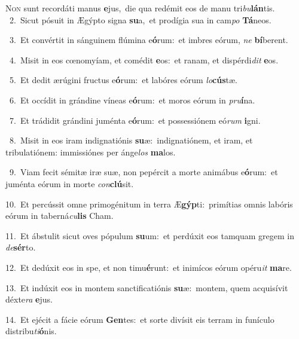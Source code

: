 \lettrine{\initial\textcolor{\initialcolor}{N}}{on} sunt recordáti manus \textbf{e}\-jus,~\star die qua redémit eos de manu tri\-\textit{bu}\-\textbf{lán}tis.\\
{\numbfont\textcolor{\numbcolor}{~2.}}~Sicut pósuit in Ægýpto signa \textbf{su}\-a,~\star et prodígia sua in cam\textit{po} \textbf{Tá}\-neos.\par
{\numbfont\textcolor{\numbcolor}{~3.}}~Et convértit in sánguinem flúmina e\-\textbf{ó}\-rum:~\star et imbres eórum, \textit{ne} \textbf{bí}\-berent.\par
{\numbfont\textcolor{\numbcolor}{~4.}}~Misit in eos cœnomyíam, et comédit \textbf{e}\-os:~\star et ranam, et dispérdi\textit{dit} \textbf{e}\-os.\par
{\numbfont\textcolor{\numbcolor}{~5.}}~Et dedit ærúgini fructus e\-\textbf{ó}\-rum:~\star et labóres eórum \textit{lo}\-\textbf{cús}tæ.\par
{\numbfont\textcolor{\numbcolor}{~6.}}~Et occídit in grándine víneas e\-\textbf{ó}\-rum:~\star et moros eórum in \textit{pru}\-\textbf{í}na.\par
{\numbfont\textcolor{\numbcolor}{~7.}}~Et trádidit grándini juménta e\-\textbf{ó}\-rum:~\star et possessiónem eó\textit{rum} \textbf{i}\-gni.\par
{\numbfont\textcolor{\numbcolor}{~8.}}~Misit in eos iram indignatiónis \textbf{su}\-æ:~\star indignatiónem, et iram, et tribulatiónem: immissiónes per ánge\textit{los} \textbf{ma}\-los.\par
{\numbfont\textcolor{\numbcolor}{~9.}}~Viam fecit sémitæ iræ suæ, non pepércit a morte animábus e\-\textbf{ó}\-rum:~\star et juménta eórum in morte \textit{con}\-\textbf{clú}sit.\par
{\numbfont\textcolor{\numbcolor}{10.}}~Et percússit omne primogénitum in terra Æ\-\textbf{gýp}\-ti:~\star primítias omnis labóris eórum in taberná\-\textit{cu}\-\textbf{lis} Cham.\par
{\numbfont\textcolor{\numbcolor}{11.}}~Et ábstulit sicut oves pópulum \textbf{su}\-um:~\star et perdúxit eos tamquam gregem in \textit{de}\-\textbf{sér}to.\par
{\numbfont\textcolor{\numbcolor}{12.}}~Et dedúxit eos in spe, et non timu\-\textbf{é}\-runt:~\star et inimícos eórum opéru\textit{it} \textbf{ma}\-re.\par
{\numbfont\textcolor{\numbcolor}{13.}}~Et indúxit eos in montem sanctificatiónis \textbf{su}\-æ:~\star montem, quem acquisívit déxte\textit{ra} \textbf{e}\-jus.\par
{\numbfont\textcolor{\numbcolor}{14.}}~Et ejécit a fácie eórum \textbf{Gen}\-tes:~\star et sorte divísit eis terram in funículo distribu\-\textit{ti}\-\textbf{ó}nis.\par
